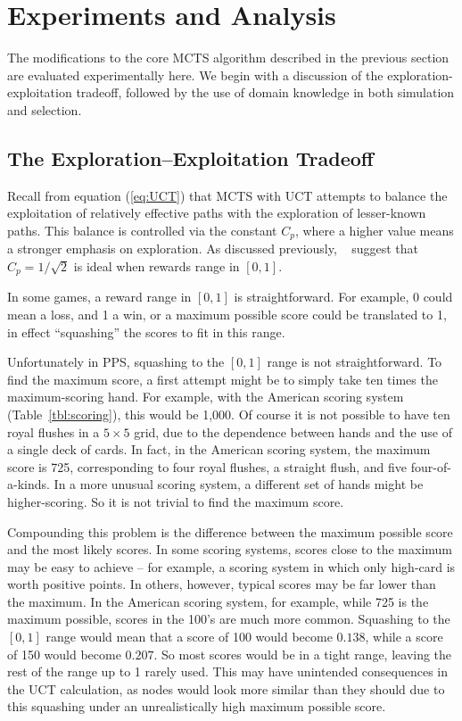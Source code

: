 \documentclass[letterpaper]{article}
\begin{document}
\section{Experiments and Analysis}

The modifications to the core MCTS algorithm described in the previous section are evaluated experimentally here. We begin with a discussion of the exploration-exploitation tradeoff, followed by the use of domain knowledge in both simulation and selection.

\subsection{The Exploration--Exploitation Tradeoff}
Recall from equation (\ref{eq:UCT}) that MCTS with UCT attempts to balance the exploitation of relatively effective paths with the exploration of lesser-known paths. This balance is controlled via the constant $C_p$, where a higher value means a stronger emphasis on exploration. As discussed previously, ~\cite{kocsis2006improved} suggest that $C_p=1 / \sqrt{2}$ is ideal when rewards range in $[0,1]$. 

In some games, a reward range in $[0,1]$ is straightforward. For example, 0 could mean a loss, and 1 a win, or a maximum possible score could be translated to 1, in effect ``squashing'' the scores to fit in this range.

Unfortunately in PPS, squashing to the $[0,1]$ range is not straightforward. To find the maximum score, a first attempt might be to simply take ten times the maximum-scoring hand. For example, with the American scoring system (Table~\ref{tbl:scoring}), this would be 1,000. Of course it is not possible to have ten royal flushes in a $5\times5$ grid, due to the dependence between hands and the use of a single deck of cards. In fact, in the American scoring system, the maximum score is 725, corresponding to four royal flushes, a straight flush, and five four-of-a-kinds. In a more unusual scoring system, a different set of hands might be higher-scoring. So it is not trivial to find the maximum score.

Compounding this problem is the difference between the maximum possible score and the most likely scores. In some scoring systems, scores close to the maximum may be easy to achieve -- for example, a scoring system in which only high-card is worth positive points. In others, however, typical scores may be far lower than the maximum. In the American scoring system, for example, while 725 is the maximum possible, scores in the 100's are much more common. Squashing to the $[0,1]$ range would mean that a score of 100 would become $0.138$, while a score of 150 would become $0.207$. So most scores would be in a tight range, leaving the rest of the range up to 1 rarely used. This may have unintended consequences in the UCT calculation, as nodes would look more similar than they should due to this squashing under an unrealistically high maximum possible score.
\end{document}
